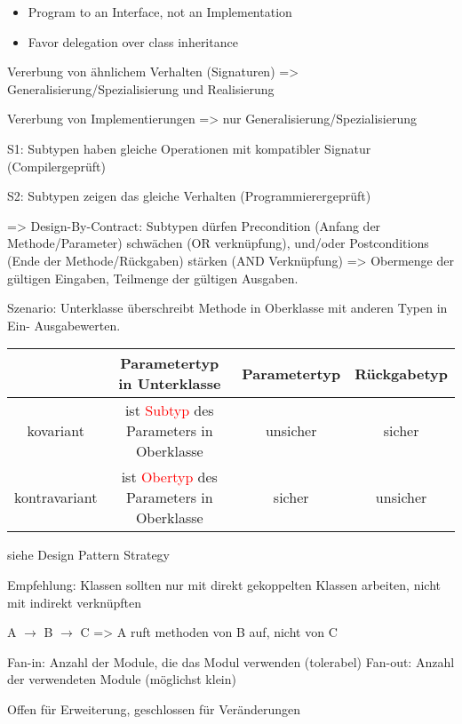 \begin{itemize}
\item Program to an Interface, not an Implementation
\item Favor delegation over class inheritance
\end{itemize}

 Vererbung von ähnlichem Verhalten (Signaturen) => Generalisierung/Spezialisierung und Realisierung

 Vererbung von Implementierungen => nur Generalisierung/Spezialisierung


S1: Subtypen haben gleiche Operationen mit kompatibler Signatur (Compilergeprüft)

S2: Subtypen zeigen das gleiche Verhalten (Programmierergeprüft)

=> Design-By-Contract: Subtypen dürfen Precondition (Anfang der Methode/Parameter) schwächen (OR verknüpfung), und/oder Postconditions (Ende der Methode/Rückgaben) stärken (AND Verknüpfung) => Obermenge der gültigen Eingaben, Teilmenge der gültigen Ausgaben.

Szenario: Unterklasse überschreibt Methode in Oberklasse mit anderen Typen in Ein- Ausgabewerten.

\begin{tabular}{|c|c|c|c|}
\hline	
& Parametertyp in Unterklasse & Parametertyp & Rückgabetyp \\
\hline
kovariant & ist \textcolor{red}{Subtyp} des Parameters in Oberklasse & unsicher & sicher\\
\hline
kontravariant & ist \textcolor{red}{Obertyp} des Parameters in Oberklasse & sicher & unsicher \\
\hline
\end{tabular}


siehe Design Pattern Strategy

Empfehlung: Klassen sollten nur mit direkt gekoppelten Klassen arbeiten, nicht mit indirekt verknüpften

A $\rightarrow$ B $\rightarrow$ C => A ruft methoden von B auf, nicht von C

Fan-in: Anzahl der Module, die das Modul verwenden (tolerabel)
Fan-out: Anzahl der verwendeten Module (möglichst klein)

Offen für Erweiterung, geschlossen für Veränderungen